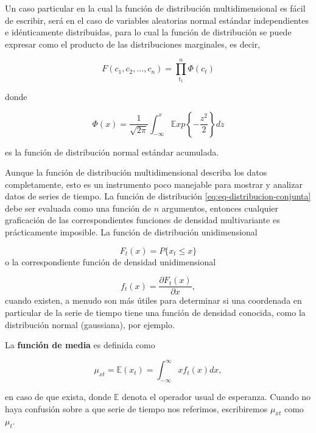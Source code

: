 \documentclass[12pt,]{krantz}
\theoremstyle{definition}
\theoremstyle{definition}
\theoremstyle{definition}
\theoremstyle{remark}
\let\BeginKnitrBlock\begin \let\EndKnitrBlock\end
\begin{document}
Un caso particular en la cual la función de distribución
multidimensional es fácil de escribir, será en el caso de variables
aleatorias normal estándar independientes e idénticamente distribuidas,
para lo cual la función de distribución se puede expresar como el
producto de las distribuciones marginales, es decir,

\begin{equation}
F(c_1,c_2,\ldots,c_n)=\prod_{t_1}^{n}\Phi(c_t)
\label{eq:eq-distribucion-producto-marginal}
\end{equation}

donde

\begin{equation}
\Phi(x)=\frac{1}{\sqrt{2\pi}}\int_{-\infty}^{x}\mathbb{E}xp\left\{-\frac{z^2}{2}\right\}dz\label{eq:eq-distribucion-normal}
\end{equation}

es la función de distribución normal estándar acumulada.

Aunque la función de distribución multidimensional describa los datos
completamente, esto es un instrumento poco manejable para mostrar y
analizar datos de series de tiempo. La función de distribución
\eqref{eq:eq-distribucion-conjunta} debe ser evaluada como una función de
\(n\) argumentos, entonces cualquier graficación de las correspondientes
funciones de densidad multivariante es prácticamente imposible. La
función de distribución unidimensional

\[F_t(x)=P\{x_t\leq x\}\] o la correspondiente función de densidad
unidimensional

\[f_t(x)=\frac{\partial F_t(x)}{\partial x},\] cuando existen, a menudo
son más útiles para determinar si una coordenada en particular de la
serie de tiempo tiene una función de densidad conocida, como la
distribución normal (gaussiana), por ejemplo.

\BeginKnitrBlock{definition}
\protect\hypertarget{def:defi-funcion-media}{}{\label{def:defi-funcion-media}
}La \textbf{función de media} es definida como

\begin{equation}
\mu_{xt}=\mathbb{E}(x_t)=\int_{-\infty}^{\infty}xf_t(x)dx,
\label{eq:eq-funcion-media}
\end{equation}

en caso de que exista, donde \(\mathbb{E}\) denota el operador usual de
esperanza. Cuando no haya confusión sobre a que serie de tiempo nos
referimos, escribiremos \(\mu_{xt}\) como \(\mu_t\).
\EndKnitrBlock{definition}
\end{document}
